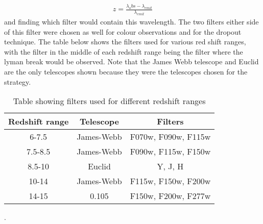 	\begin{align}
		z=\frac{{{\lambda}_obs}-{{\lambda}_{emit}}}{{{\lambda}_{emit}}}
	\end{align}
and finding which filter would contain this wavelength. The two filters either side of this filter were chosen as well for colour observations and for the dropout technique. The table below shows the filters used for various red shift ranges, with the filter in the middle of each redshift range being the filter where the lyman break would be observed. Note that the James Webb telescope and Euclid are the only telescopes shown because they were the telescopes chosen for the strategy.

\begin{table}[ht]
				\begin{center}
					\begin{tabular}{c|c|c}
						Redshift range &Telescope &Filters   \\
						\hline \hline
						6-7.5	   &James-Webb&  F070w, F090w, F115w \\
						7.5-8.5&James-Webb&  F090w, F115w, F150w \\
						8.5-10 &Euclid&  Y, J, H\\
						10-14  &James-Webb& F115w, F150w, F200w\\
						14-15  &0.105& F150w, F200w, F277w\\
					\end{tabular}
				\end{center}
				\caption{Table showing filters used for different redshift ranges}
				\label{tab:colour_filters}
			\end{table}.




